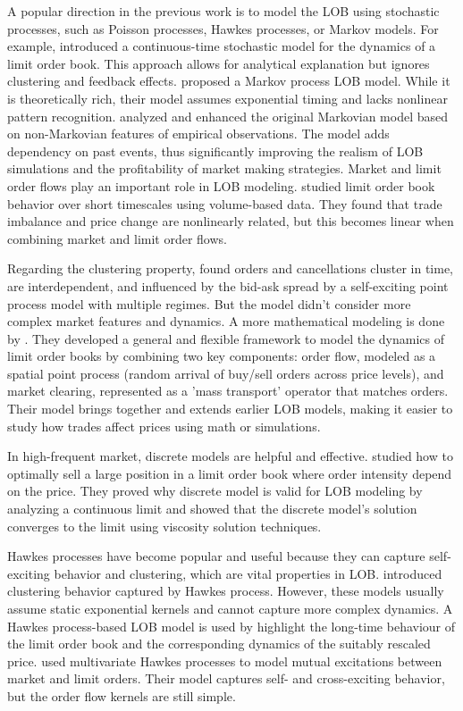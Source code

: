 A popular direction in the previous work is to model the LOB using stochastic processes, such as Poisson processes, Hawkes processes, or Markov models. For example, \cite{cont_stochastic_2010} introduced a continuous-time stochastic model for the dynamics of a limit order book. This approach allows for analytical explanation but ignores clustering and feedback effects. 
\cite{bleher_orders_2021} proposed a Markov process LOB model. While it is theoretically rich, their model assumes exponential timing and lacks nonlinear pattern recognition.
\cite{lu_order-book_2018} analyzed and enhanced the original Markovian model based on non-Markovian features of empirical observations. The model adds dependency on past events, thus significantly improving the realism of LOB simulations and the profitability of market making strategies. 
Market and limit order flows play an important role in LOB modeling. \cite{bechler2017orderflowslimitorder} studied limit order book behavior over short timescales using volume-based data. They found that trade imbalance and price change are nonlinearly related, but this becomes linear when combining market and limit order flows. 

Regarding the clustering property, \cite{vinkovskaya_point_nodate} found orders and cancellations cluster in time, are interdependent, and influenced by the bid-ask spread by a self-exciting point process model with multiple regimes. But the model didn't consider more complex market features and dynamics.
A more mathematical modeling is done by \cite{cont_mathematical_2023}. They developed a general and flexible framework to model the dynamics of limit order books by combining two key components: order flow, modeled as a spatial point process (random arrival of buy/sell orders across price levels), and market clearing, represented as a 'mass transport' operator that matches orders. Their model brings together and extends earlier LOB models, making it easier to study how trades affect prices using math or simulations.

In high-frequent market, discrete models are helpful and effective. \cite{bayraktar_liquidation_2012} studied how to optimally sell a large position in a limit order book where order intensity depend on the price. They proved why discrete model is valid for LOB modeling by analyzing a continuous limit and showed that the discrete model's solution converges to the limit using viscosity solution techniques. 

Hawkes processes have become popular and useful because they can capture self-exciting behavior and clustering, which are vital properties in LOB. \cite{fonseca_clustering_2015} introduced clustering behavior captured by Hawkes process. However, these models usually assume static exponential kernels and cannot capture more complex dynamics. A Hawkes process-based LOB model is used by \cite{abergel_long-time_2015} highlight the long-time behaviour of the limit order book and the corresponding dynamics of the suitably rescaled price. \cite{zheng_ergodicity_2013} used multivariate Hawkes processes to model mutual excitations between market and limit orders. Their model captures self- and cross-exciting behavior, but the order flow kernels are still simple. 

